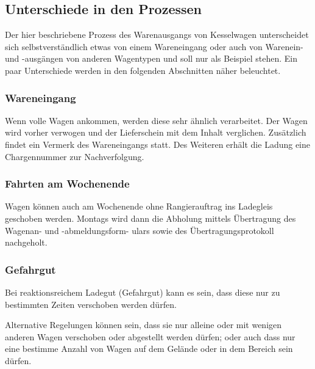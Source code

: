 \subsection{Unterschiede in den Prozessen}
Der hier beschriebene Prozess des Warenausgangs von Kesselwagen unterscheidet sich selbstverständlich etwas von einem Wareneingang oder auch von Warenein- und -ausgängen von anderen Wagentypen und soll nur als Beispiel stehen. Ein paar Unterschiede werden in den folgenden Abschnitten näher beleuchtet.
\subsubsection{Wareneingang}
Wenn volle Wagen ankommen, werden diese sehr ähnlich verarbeitet. Der Wagen wird vorher verwogen und der Lieferschein mit dem Inhalt verglichen. Zusätzlich findet ein Vermerk des Wareneingangs statt. Des Weiteren erhält die Ladung eine Chargennummer zur Nachverfolgung.
\subsubsection{Fahrten am Wochenende}
Wagen können auch am Wochenende ohne Rangierauftrag ins Ladegleis geschoben werden. Montags wird dann die Abholung mittels Übertragung des Wagenan- und -abmeldungsform- ulars sowie des Übertragungsprotokoll nachgeholt.
\subsubsection{Gefahrgut}
Bei reaktionsreichem Ladegut (Gefahrgut) kann es sein, dass diese nur zu bestimmten Zeiten verschoben werden dürfen.\par
Alternative Regelungen können sein,  dass sie nur alleine oder mit wenigen anderen Wagen verschoben oder abgestellt werden dürfen; oder auch dass nur eine bestimme Anzahl von Wagen auf dem Gelände oder in dem Bereich sein dürfen.
